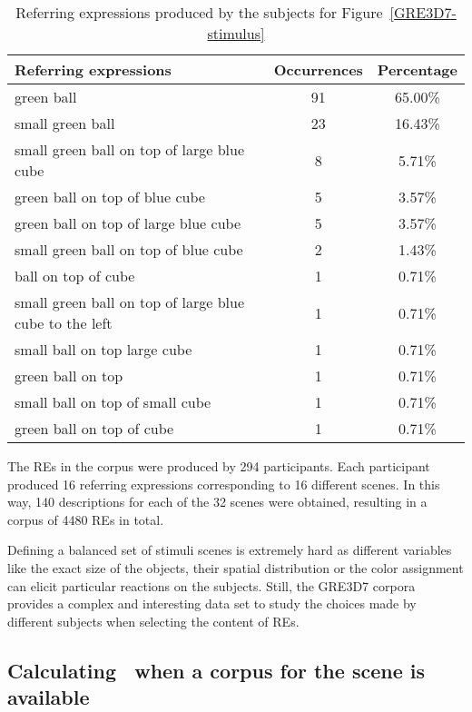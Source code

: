 \begin{table}[h!]
\begin{center}
\begin{tabular}{|l|c|c|}
\hline
Referring expressions & Occurrences & Percentage \\
\hline
green ball & 91 & 65.00\% \\
small green ball & 23 & 16.43\% \\
small green ball on top of large blue cube & 8 & 5.71\% \\
green ball on top of blue cube & 5 & 3.57\% \\
green ball on top of large blue cube & 5 & 3.57\% \\
small green ball on top of blue cube & 2 & 1.43\% \\
ball on top of cube & 1 & 0.71\% \\
small green ball on top of large blue cube to the left & 1 & 0.71\% \\
small ball on top large cube & 1 & 0.71\% \\
green ball on top & 1 & 0.71\% \\
small ball on top of small cube & 1 & 0.71\% \\
green ball on top of cube & 1 & 0.71\% \\
\hline
\end{tabular}
\caption{Referring expressions produced by the subjects for Figure~\ref{GRE3D7-stimulus}\label{corpus-distribution}}
\end{center}
\end{table}

The REs in the corpus were produced by 294 participants. Each participant produced 16 referring expressions corresponding to 16 different scenes. In this way, 140 descriptions for each of the 32 scenes were obtained, resulting in a corpus of 4480 REs in total. 

Defining a balanced set of stimuli scenes is extremely hard as different variables like the exact size of the objects, their spatial distribution or the color assignment can elicit particular reactions on the subjects.  Still, the GRE3D7 corpora provides a complex and interesting data set to study the choices made by different subjects when selecting the content of REs. 


\subsection{Calculating \puse\ when a corpus for the scene is available}

